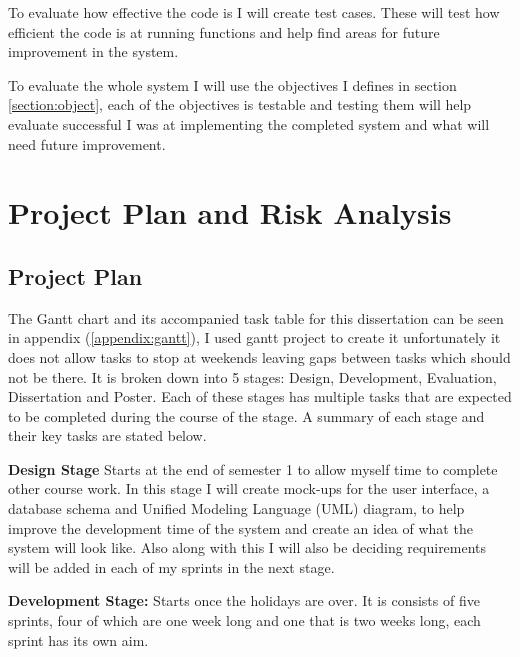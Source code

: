 \documentclass[12pt]{article}  %
\begin{document}
To evaluate how effective the code is I will create test cases. These will test how efficient the code is at running functions and help find areas for future improvement in the system.

To evaluate the whole system I will use the objectives I defines in section \ref{section:object}, each of the objectives is testable and testing them will help evaluate successful I was at implementing the completed system and what will need future improvement.




\newpage
\section{Project Plan and Risk Analysis}

\subsection{Project Plan}


The Gantt chart and its accompanied task table for this dissertation can be seen in appendix (\ref{appendix:gantt}), I used gantt project to create it unfortunately it does not allow tasks to stop at weekends leaving gaps between tasks which should not be there. It is broken down into 5 stages: Design, Development, Evaluation, Dissertation and Poster. Each of these stages has multiple tasks that are expected to be completed during the course of the stage. A summary of each stage and their key tasks are stated below.\bigskip

\noindent
\textbf{Design Stage} Starts at the end of semester 1 to allow myself time to complete other course work. In this stage I will create mock-ups for the user interface, a database schema and Unified Modeling Language (UML) diagram, to help improve the development time of the system and create an idea of what the system will look like. Also along with this I will also be deciding requirements will be added in each of my sprints in the next stage.\bigskip

\noindent
\textbf{Development Stage:} Starts once the holidays are over. It is consists of five sprints, four of which are one week long and one that is two weeks long, each sprint has its own aim.
\end{document}
